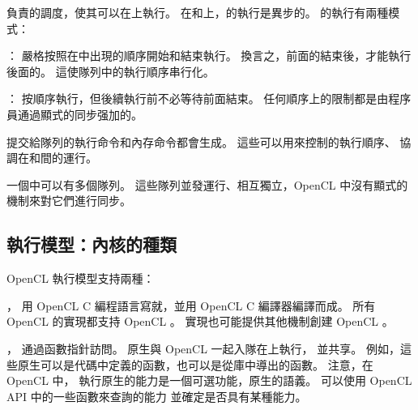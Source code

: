 負責的調度，使其可以在上執行。
在和上，的執行是異步的。
的執行有兩種模式：
\startigBase
\item {}：
嚴格按照在中出現的順序開始和結束執行。
換言之，前面的結束後，才能執行後面的。
這使隊列中的執行順序串行化。

\item {}：
按順序執行，但後續執行前不必等待前面結束。
任何順序上的限制都是由程序員通過顯式的同步强加的。
\stopigBase

提交給隊列的執行命令和內存命令都會生成。
這些可以用來控制的執行順序、
協調在和間的運行。

一個中可以有多個隊列。
這些隊列並發運行、相互獨立，OpenCL 中沒有顯式的機制來對它們進行同步。

\subsection{執行模型：內核的種類}

OpenCL 執行模型支持兩種：
\startigBase
\item {}，
用 OpenCL C 編程語言寫就，並用 OpenCL C 編譯器編譯而成。
所有 OpenCL 的實現都支持 OpenCL 。
實現也可能提供其他機制創建 OpenCL 。

\item {}，
通過函數指針訪問。
原生與 OpenCL 一起入隊在上執行，
並共享。
例如，這些原生可以是代碼中定義的函數，也可以是從庫中導出的函數。
注意，在 OpenCL 中，
執行原生的能力是一個可選功能，原生的語義。
可以使用 OpenCL API 中的一些函數來查詢的能力
並確定是否具有某種能力。
\stopigBase

